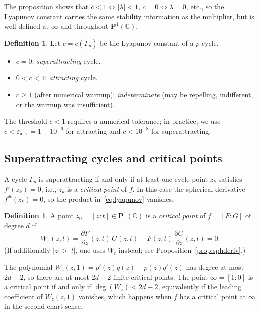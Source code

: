 \documentclass[12pt]{article}
\theoremstyle{definition}
\newtheorem{definition}[theorem]{Definition}
\newcommand{\C}{\mathbb{C}}
\newcommand{\Pone}{\mathbf{P}^1(\C)}
\newcommand{\fsh}{f^{\#}}
\newcommand{\hpair}{[F:G]}
\begin{document}
The proposition shows that $c<1\Leftrightarrow|\lambda|<1$,
$c=0\Leftrightarrow\lambda=0$, etc., so the Lyapunov constant carries
the same stability information as the multiplier, but is well-defined
at $\infty$ and throughout $\Pone$.

\begin{definition}\label{def:classification}
Let $c=c(\Gamma_p)$ be the Lyapunov constant of a $p$-cycle.
\begin{itemize}[noitemsep]
  \item $c=0$: \emph{superattracting} cycle.
  \item $0<c<1$: \emph{attracting} cycle.
  \item $c\geq 1$ (after numerical warmup): \emph{indeterminate}
        (may be repelling, indifferent, or the warmup was insufficient).
\end{itemize}
\end{definition}

The threshold $c<1$ requires a numerical tolerance; in practice, we use
$c<\varepsilon_{\mathrm{attr}}=1-10^{-6}$ for attracting and
$c<10^{-8}$ for superattracting.

\subsection{Superattracting cycles and critical points}

A cycle $\Gamma_p$ is superattracting if and only if at least one cycle
point $z_k$ satisfies $f'(z_k)=0$, i.e., $z_k$ is a \emph{critical point}
of $f$.  In this case the spherical derivative $\fsh(z_k)=0$, so the product
in~\eqref{eq:lyapunov} vanishes.

\begin{definition}\label{def:critical}
A point $z_0=[z:t]\in\Pone$ is a \emph{critical point} of $f=\hpair$ of
degree $d$ if
\[
  W_z(z,t) = \frac{\partial F}{\partial z}(z,t)\,G(z,t)
            - F(z,t)\,\frac{\partial G}{\partial z}(z,t) = 0.
\]
(If additionally $|z|>|t|$, one uses $W_t$ instead; see
Proposition~\ref{prop:sphderiv}.)
\end{definition}

The polynomial $W_z(z,1) = p'(z)q(z)-p(z)q'(z)$ has degree at most
$2d-2$, so there are at most $2d-2$ finite critical points.  The point
$\infty=[1:0]$ is a critical point if and only if $\deg(W_z)<2d-2$,
equivalently if the leading coefficient of $W_z(z,1)$ vanishes, which
happens when $f$ has a critical point at $\infty$ in the second-chart
sense.
\end{document}
